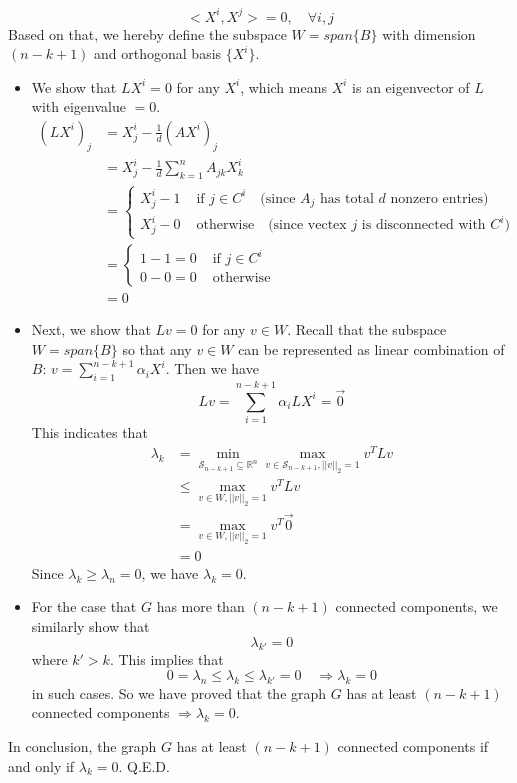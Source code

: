 \documentclass[english,onecolumn]{IEEEtran}
\newcommand{\Rbb}{\mathbb{R}}
\newcommand{\bigS}{\mathcal{S}}
\begin{document}
\begin{enumerate}
\begin{itemize}
$$<X^i, X^j> = 0,\quad \forall i,j$$
Based on that, we hereby define the subspace $W=span\{B\}$ with dimension $(n-k+1)$ and orthogonal basis $\{X^i\}$. 
\begin{itemize}
	\item We show that $LX^i = 0$ for any $X^i$, which means $X^i$ is an eigenvector of $L$ with eigenvalue $=0$.
		\begin{align*}
			(LX^i)_j &= X^i_j - \frac{1}{d} (AX^i)_j\\
			&= X^i_j - \frac{1}{d}\sum_{k =1}^n A_{jk}X^i_k\\
			&= \left\{
\begin{aligned}
 X^i_j  - 1 &\text{ if }  j\in C^i\quad \text{(since } A_j \text{ has total } d \text{ nonzero entries)}\\
X^i_j - 0  & \text{ otherwise} \quad\text{(since vectex } j \text{ is disconnected with } C^i)
\end{aligned}
\right.
			\\ &= \left\{
\begin{aligned}
 1 - 1 =0 &\text{ if }  j\in C^i\\
 0-0 = 0 & \text{ otherwise} 
\end{aligned}
\right.
			\\\
			&=0
		\end{align*}
\item Next, we show that $Lv = 0$ for any $v \in W$. Recall that the subspace $W = span\{B\}$ so that any $v \in W$ can be represented as linear combination of $B$: $v = \sum_{i=1}^{n-k+1} \alpha_i X^i.$ Then we have 
	$$Lv = \sum_{i=1}^{n-k+1}\alpha_i LX^i = \vec{0}$$
	This indicates that 
	\begin{align*}
		\lambda_k &= \min\limits_{\bigS_{n-k+1}\subseteq \Rbb^n}\max\limits_{v\in\bigS_{n-k+1},||v||_2=1} v^TLv\\
		&\le \max\limits_{v\in W,||v||_2=1} v^TLv\\
		&=   \max\limits_{v\in W,||v||_2=1} v^T \vec{0}\\
		&= 0 
	\end{align*}
	Since $\lambda_k \ge \lambda_n = 0$, we have $\lambda_k = 0$. 
\item For the case that $G$ has more than $(n-k+1)$ connected components, we similarly show that 
	$$\lambda_{k'} = 0$$
	where $k' > k$. This implies that 
	$$0=\lambda_n\le\lambda_k \le \lambda_{k'} = 0 \quad \Rightarrow \lambda_k = 0$$
	in such cases.  So we have proved that the graph $G$ has at least $(n-k+1)$ connected components $\Rightarrow \lambda_k=0$.
\end{itemize}
In conclusion, the graph $G$ has at least $(n-k+1)$ connected components if and only if $\lambda_k=0$. Q.E.D.
    \end{itemize}
\end{enumerate}
\end{document}
